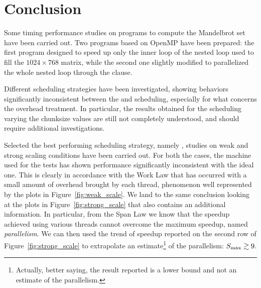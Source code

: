 \section{Conclusion}\label{sec:concl}
Some timing performance studies on programs to compute the Mandelbrot set have been carried out. Two programs based on OpenMP have been prepared: the first program designed to speed up only the inner loop of the nested loop used to fill the $1024 \times 768$ matrix, while the second one slightly modified to parallelized the whole nested loop through the  clause. 

Different scheduling strategies have been investigated, showing behaviors significantly inconsistent between the  and  scheduling, especially for what concerns the overhead treatment. In particular, the results obtained for the  scheduling varying the chunksize values are still not completely understood, and should require additional investigations.

Selected the best performing scheduling strategy, namely , studies on weak and strong scaling conditions have been carried out. For both the cases, the machine used for the tests has shown performance significantly inconsistent with the ideal one. This is clearly in accordance with the Work Law that has occurred with a small amount of overhead brought by each thread, phenomenon well represented by the plots in Figure~\ref{fig:weak_scale}. We land to the same conclusion looking at the plots in Figure~\ref{fig:strong_scale} that also contains an additional information. In particular, from the Span Law we know that the speedup achieved using various threads cannot overcome the maximum speedup, named \emph{parallelism}. We can then used the trend of speedup reported on the second row of Figure~\ref{fig:strong_scale} to extrapolate an estimate\footnote{Actually, better saying, the result reported is a lower bound and not an estimate of the parallelism.} of the parallelism: $S_{\rm{max}} \gtrsim 9$.